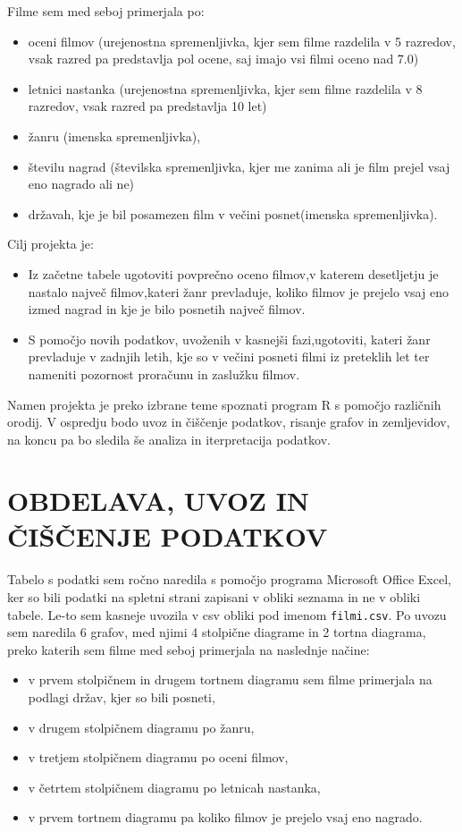 \documentclass[11pt,a4paper]{article}
\begin{document}
\null
Filme sem med seboj primerjala po:
\begin{itemize}
\item oceni filmov (urejenostna spremenljivka, kjer sem filme razdelila v 5 razredov, vsak razred pa predstavlja pol ocene, saj imajo vsi filmi oceno nad 7.0) 
\item letnici nastanka (urejenostna spremenljivka, kjer sem filme razdelila v 8 razredov, vsak razred pa predstavlja 10 let)
\item žanru (imenska spremenljivka),
\item številu nagrad (številska spremenljivka, kjer me zanima ali je film prejel vsaj eno nagrado ali ne)
\item državah, kje je bil posamezen film v večini posnet(imenska spremenljivka).
\end{itemize}

\null
Cilj projekta je:
\begin{itemize}
\item Iz začetne tabele ugotoviti povprečno oceno filmov,v katerem desetljetju je nastalo največ filmov,kateri žanr prevladuje, koliko filmov je prejelo vsaj eno izmed nagrad in kje je bilo posnetih največ filmov.
\item S pomočjo novih podatkov, uvoženih v kasnejši fazi,ugotoviti, kateri žanr prevladuje v zadnjih letih, kje so v večini posneti filmi iz preteklih let ter nameniti pozornost proračunu in zaslužku filmov. 
\end{itemize}

\null
Namen projekta je preko izbrane teme spoznati program R s pomočjo različnih orodij. V ospredju bodo uvoz in čiščenje podatkov, risanje grafov in zemljevidov, na koncu pa bo sledila še analiza in iterpretacija podatkov.

\pagebreak
\section{OBDELAVA, UVOZ IN ČIŠČENJE PODATKOV}
\paragraph{} Tabelo s podatki sem ročno naredila s pomočjo programa Microsoft Office Excel, ker so bili podatki na spletni strani zapisani v obliki seznama in ne v obliki tabele. Le-to sem kasneje uvozila v csv obliki pod imenom \verb|filmi.csv|. Po uvozu sem naredila 6 grafov, med njimi 4 stolpične diagrame in 2 tortna diagrama, preko katerih sem filme med seboj primerjala na naslednje načine:
\begin{itemize}
\item v prvem stolpičnem in drugem tortnem diagramu sem filme primerjala na podlagi držav, kjer so bili posneti,
\item v drugem stolpičnem diagramu po žanru,
\item v tretjem stolpičnem diagramu po oceni filmov,
\item v četrtem stolpičnem diagramu po letnicah nastanka,
\item v prvem tortnem diagramu pa koliko filmov je prejelo vsaj eno nagrado.
\end{itemize}
\end{document}

